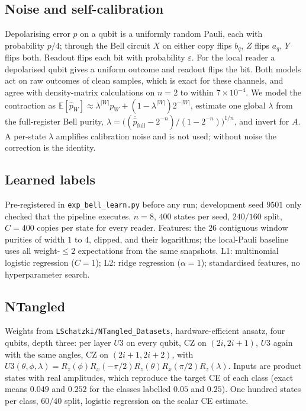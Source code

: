 \documentclass[11pt,a4paper]{article}
\begin{document}
\subsection{Noise and self-calibration}
Depolarising error $p$ on a qubit is a uniformly random Pauli, each with probability $p/4$; through
the Bell circuit $X$ on either copy flips $b_q$, $Z$ flips $a_q$, $Y$ flips both. Readout flips each
bit with probability $\varepsilon$. For the local reader a depolarised qubit gives a uniform outcome
and readout flips the bit. Both models act on raw outcomes of clean samples, which is exact for
these channels, and agree with density-matrix calculations on $n=2$ to within $7\times10^{-4}$. We
model the contraction as $\mathbb{E}[\hat p_W]\approx\lambda^{|W|}p_W+(1-\lambda^{|W|})2^{-|W|}$,
estimate one global $\lambda$ from the full-register Bell purity,
$\lambda=\big((\overline{\hat p}_{\mathrm{full}}-2^{-n})/(1-2^{-n})\big)^{1/n}$, and invert for $A$.
A per-state $\lambda$ amplifies calibration noise and is not used; without noise the correction is
the identity.

\subsection{Learned labels}
Pre-registered in \texttt{exp\_bell\_learn.py} before any run; development seed $9501$ only checked
that the pipeline executes. $n=8$, $400$ states per seed, $240/160$ split, $C=400$ copies per state
for every reader. Features: the $26$ contiguous window purities of width $1$ to $4$, clipped, and
their logarithms; the local-Pauli baseline uses all weight-$\le2$ expectations from the same
snapshots. L1: multinomial logistic regression ($C=1$); L2: ridge regression ($\alpha=1$);
standardised features, no hyperparameter search.

\subsection{NTangled}
Weights from \texttt{LSchatzki/NTangled\_Datasets}, hardware-efficient ansatz, four qubits, depth
three: per layer $U3$ on every qubit, CZ on $(2i,2i+1)$, $U3$ again with the same angles, CZ on
$(2i+1,2i+2)$, with $U3(\theta,\phi,\lambda)=R_z(\phi)R_x(-\pi/2)R_z(\theta)R_x(\pi/2)R_z(\lambda)$.
Inputs are product states with real amplitudes, which reproduce the target CE of each class (exact
means $0.049$ and $0.252$ for the classes labelled $0.05$ and $0.25$). One hundred states per class,
$60/40$ split, logistic regression on the scalar CE estimate.
\end{document}
